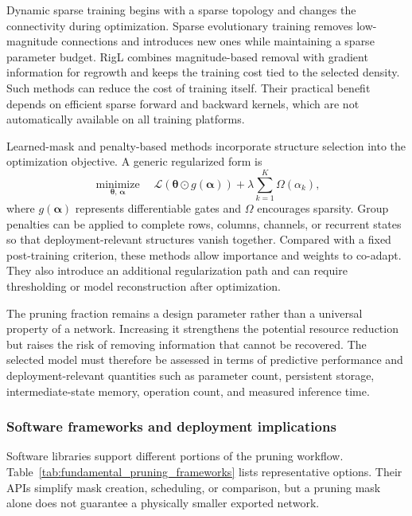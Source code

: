 \documentclass[
    a4paper,
    12pt,
    titlepage,
    bibliography=totoc,
    twoside=on,
    parskip=false,
    numbers=noenddot,
    cleardoublepage=empty,
    DIV=12,
    BCOR=12.0mm,
    headheight=36pt,
    headings=openright
]{scrreprt}
\begin{document}
Dynamic sparse training begins with a sparse topology and changes the connectivity during optimization. Sparse evolutionary training removes low-magnitude connections and introduces new ones while maintaining a sparse parameter budget.\autocite{mocanuScalableSparseConnectivity2018} RigL combines magnitude-based removal with gradient information for regrowth and keeps the training cost tied to the selected density.\autocite{evciRiggingLottery2020} Such methods can reduce the cost of training itself. Their practical benefit depends on efficient sparse forward and backward kernels, which are not automatically available on all training platforms.

Learned-mask and penalty-based methods incorporate structure selection into the optimization objective. A generic regularized form is
\begin{equation}
    \underset{\boldsymbol{\theta},\,\boldsymbol{\alpha}}{\operatorname{minimize}}
    \quad
    \mathcal L\!\left(
        \boldsymbol{\theta}\odot
        g(\boldsymbol{\alpha})
    \right)
    +
    \lambda
    \sum_{k=1}^{K}
    \Omega\!\left(\alpha_k\right),
    \label{eq:fundamental_learned_mask}
\end{equation}
where $g(\boldsymbol{\alpha})$ represents differentiable gates and $\Omega$ encourages sparsity. Group penalties can be applied to complete rows, columns, channels, or recurrent states so that deployment-relevant structures vanish together.\autocite{louizosLearningSparseL02018,wenLearningStructuredSparsity2016} Compared with a fixed post-training criterion, these methods allow importance and weights to co-adapt. They also introduce an additional regularization path and can require thresholding or model reconstruction after optimization.

The pruning fraction remains a design parameter rather than a universal property of a network. Increasing it strengthens the potential resource reduction but raises the risk of removing information that cannot be recovered. The selected model must therefore be assessed in terms of predictive performance and deployment-relevant quantities such as parameter count, persistent storage, intermediate-state memory, operation count, and measured inference time.

\subsubsection{Software frameworks and deployment implications}

Software libraries support different portions of the pruning workflow. Table~\ref{tab:fundamental_pruning_frameworks} lists representative options. Their APIs simplify mask creation, scheduling, or comparison, but a pruning mask alone does not guarantee a physically smaller exported network.
\end{document}

